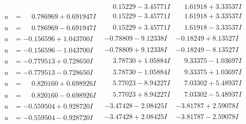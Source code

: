 \documentclass[1p]{elsarticle_modified}
\theoremstyle{definition}
\begin{document}
$$\begin{array}{c|c|c}
 & \phantom{-}0.15229 - 3.45771 I & \phantom{-}1.61918 + 3.33537 I \\ \hline\begin{aligned}
u &= \phantom{-}0.786969 + 0.691947 I\end{aligned}
 & \phantom{-}0.15229 - 3.45771 I & \phantom{-}1.61918 + 3.33537 I \\ \hline\begin{aligned}
u &= \phantom{-}0.786969 - 0.691947 I\end{aligned}
 & \phantom{-}0.15229 + 3.45771 I & \phantom{-}1.61918 - 3.33537 I \\ \hline\begin{aligned}
u &= -0.156596 + 1.043700 I\end{aligned}
 & -0.78809 - 9.12338 I & -0.18249 + 8.13527 I \\ \hline\begin{aligned}
u &= -0.156596 - 1.043700 I\end{aligned}
 & -0.78809 + 9.12338 I & -0.18249 - 8.13527 I \\ \hline\begin{aligned}
u &= -0.779513 + 0.728650 I\end{aligned}
 & \phantom{-}3.78730 + 1.05884 I & \phantom{-}9.33375 - 1.03697 I \\ \hline\begin{aligned}
u &= -0.779513 - 0.728650 I\end{aligned}
 & \phantom{-}3.78730 - 1.05884 I & \phantom{-}9.33375 + 1.03697 I \\ \hline\begin{aligned}
u &= \phantom{-}0.820160 + 0.698926 I\end{aligned}
 & \phantom{-}5.77023 - 8.94227 I & \phantom{-}7.03302 + 5.48937 I \\ \hline\begin{aligned}
u &= \phantom{-}0.820160 - 0.698926 I\end{aligned}
 & \phantom{-}5.77023 + 8.94227 I & \phantom{-}7.03302 - 5.48937 I \\ \hline\begin{aligned}
u &= -0.559504 + 0.928720 I\end{aligned}
 & -3.47428 - 2.08425 I & -3.81787 + 2.59078 I \\ \hline\begin{aligned}
u &= -0.559504 - 0.928720 I\end{aligned}
 & -3.47428 + 2.08425 I & -3.81787 - 2.59078 I \\ \hline\begin{aligned}

\end{aligned}
\end{array}$$
\end{document}
